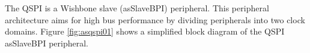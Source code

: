 The QSPI is a Wishbone slave (asSlaveBPI) peripheral. This peripheral architecture aims for high bus performance by dividing peripherals into two clock domains. Figure \ref{fig:asqspi01} shows a simplified block diagram of the QSPI asSlaveBPI peripheral.
